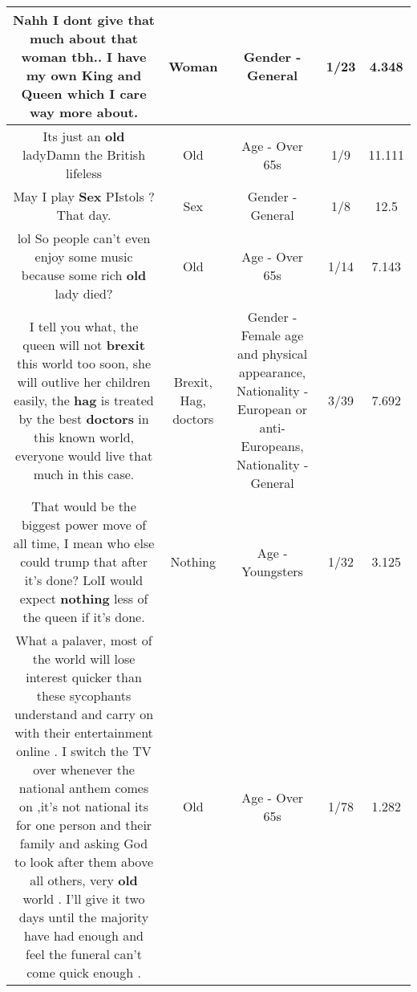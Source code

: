 \documentclass[11pt]{article}
\newlength\mylength
\begin{document}
\begin{center}
\begin{longtable}{|C{.65\mylength}|C{.30\mylength}|C{.12\mylength}|C{.12\mylength}|C{.12\mylength}|}
  \small Nahh I dont give that much about that \textbf{woman} tbh.. I have my own King and Queen which I care way more about.\normalsize   & Woman & Gender - General & 1/23 & 4.348 \\  \hline
  \small Its just an \textbf{old} ladyDamn the British lifeless\normalsize   & Old & Age - Over 65s & 1/9 & 11.111 \\  \hline
  \small May I play \textbf{Sex} PIstols ? That day.\normalsize   & Sex & Gender - General & 1/8 & 12.5 \\  \hline
  \small lol So people can't even enjoy some music because some rich \textbf{old} lady died?\normalsize   & Old & Age - Over 65s & 1/14 & 7.143 \\  \hline
  \small I tell you what, the queen will not \textbf{brexit} this world too soon, she will outlive her children easily, the \textbf{hag} is treated by the best \textbf{doctors} in this known world, everyone would live that much in this case.\normalsize   & Brexit, Hag, doctors & Gender - Female age and physical appearance, Nationality - European or anti-Europeans, Nationality - General & 3/39 & 7.692 \\  \hline
  \small That would be the biggest power move of all time, I mean who else could trump that after it's done? LolI would expect \textbf{nothing} less of the queen if it's done.\normalsize   & Nothing & Age - Youngsters & 1/32 & 3.125 \\  \hline
  \small What a palaver,  most of the world will lose interest quicker than these sycophants understand and carry on with their entertainment online . I switch the TV over whenever the national anthem comes on ,it's not national its for one person and their family and asking God to look after them above all others,  very \textbf{old} world . I'll give it two days until the majority have had enough and feel the funeral can't come quick enough .\normalsize   & Old & Age - Over 65s & 1/78 & 1.282 \\  \hline

\end{longtable}
\end{center}
\end{document}
